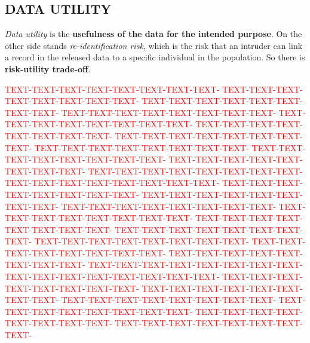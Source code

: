 \documentclass[a0,portrait]{a0poster}
\begin{document}
\begin{multicols}{3}
\subsection{DATA UTILITY}

\textit{Data utility} is the \textbf{usefulness of the data for the intended purpose}. On the other side stands \textit{re-identification risk}, which is the risk that an intruder can link a record in the released data to a specific individual in the population. So there is \textbf{risk-utility trade-off}.

\textcolor{red}{
TEXT-TEXT-TEXT-TEXT-TEXT-TEXT-TEXT-TEXT-
TEXT-TEXT-TEXT-TEXT-TEXT-TEXT-TEXT-TEXT-
TEXT-TEXT-TEXT-TEXT-TEXT-TEXT-TEXT-TEXT-
TEXT-TEXT-TEXT-TEXT-TEXT-TEXT-TEXT-TEXT-
TEXT-TEXT-TEXT-TEXT-TEXT-TEXT-TEXT-TEXT-
TEXT-TEXT-TEXT-TEXT-TEXT-TEXT-TEXT-TEXT-
TEXT-TEXT-TEXT-TEXT-TEXT-TEXT-TEXT-TEXT-
TEXT-TEXT-TEXT-TEXT-TEXT-TEXT-TEXT-TEXT-
TEXT-TEXT-TEXT-TEXT-TEXT-TEXT-TEXT-TEXT-
TEXT-TEXT-TEXT-TEXT-TEXT-TEXT-TEXT-TEXT-
TEXT-TEXT-TEXT-TEXT-TEXT-TEXT-TEXT-TEXT-
TEXT-TEXT-TEXT-TEXT-TEXT-TEXT-TEXT-TEXT-
TEXT-TEXT-TEXT-TEXT-TEXT-TEXT-TEXT-TEXT-
TEXT-TEXT-TEXT-TEXT-TEXT-TEXT-TEXT-TEXT-
TEXT-TEXT-TEXT-TEXT-TEXT-TEXT-TEXT-TEXT-
TEXT-TEXT-TEXT-TEXT-TEXT-TEXT-TEXT-TEXT-
TEXT-TEXT-TEXT-TEXT-TEXT-TEXT-TEXT-TEXT-
TEXT-TEXT-TEXT-TEXT-TEXT-TEXT-TEXT-TEXT-
TEXT-TEXT-TEXT-TEXT-TEXT-TEXT-TEXT-TEXT-
TEXT-TEXT-TEXT-TEXT-TEXT-TEXT-TEXT-TEXT-
TEXT-TEXT-TEXT-TEXT-TEXT-TEXT-TEXT-TEXT-
TEXT-TEXT-TEXT-TEXT-TEXT-TEXT-TEXT-TEXT-
TEXT-TEXT-TEXT-TEXT-TEXT-TEXT-TEXT-TEXT-
TEXT-TEXT-TEXT-TEXT-TEXT-TEXT-TEXT-TEXT-
TEXT-TEXT-TEXT-TEXT-TEXT-TEXT-TEXT-TEXT-
TEXT-TEXT-TEXT-TEXT-TEXT-TEXT-TEXT-TEXT-
TEXT-TEXT-TEXT-TEXT-TEXT-TEXT-TEXT-TEXT-
TEXT-TEXT-TEXT-TEXT-TEXT-TEXT-TEXT-TEXT-
TEXT-TEXT-TEXT-TEXT-TEXT-TEXT-TEXT-TEXT-
} 



\end{multicols}
\end{document}

